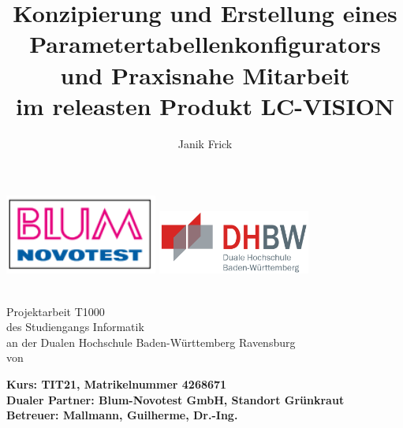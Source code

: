 \documentclass[12pt,a4paper]{article}
\author{Janik Frick}
\title{Konzipierung und Erstellung eines Parametertabellenkonfigurators und Praxisnahe Mitarbeit\\\vspace{0.35cm}
 im releasten Produkt LC-VISION}
\newcommand{\dualerPartner}{Blum-Novotest GmbH, Standort Grünkraut}
\newcommand{\hochschule}{Dualen Hochschule Baden-Württemberg Ravensburg}
\newcommand{\betreuer}{Mallmann, Guilherme, Dr.-Ing.}
\newcommand{\studiengang}{Informatik}
\newcommand{\kurs}{TIT21, Matrikelnummer 4268671}
\begin{document}
\begin{titlepage}
\includegraphics[width=50mm,scale=1]{blum-logo.PNG}
\hfill
\includegraphics[width=50mm,scale=1]{dhbw.png}
   \begin{center}
       \textbf{\huge{\thetitle}}\\
       \vspace{2cm}
       \Large{Projektarbeit T1000\\
       des Studiengangs \studiengang\\
       an der \hochschule\\
       \vspace{1.5cm}
       von\\
       \vspace{0.5cm}
       \theauthor}
       
   \end{center}
       \vspace{1.6cm}
       \noindent
       \vspace{0.3cm}
       \textbf{\large{Kurs: \kurs}}\\
       \vspace{0.3cm}
       \textbf{\large{Dualer Partner: \dualerPartner}}\\
       \vspace{0.3cm}
       \textbf{\large{Betreuer: \betreuer}}
       

\end{titlepage}
\thispagestyle{empty}
\end{document}
